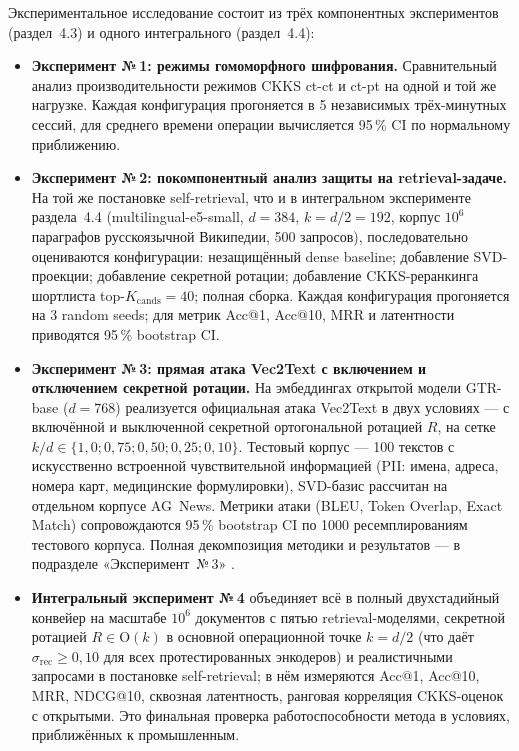 \documentclass[a4paper, 12pt, oneside, openany]{article}
\begin{document}
Экспериментальное исследование состоит из трёх компонентных экспериментов (раздел~4.3) и одного интегрального (раздел~4.4):
\begin{itemize}
	\item \textbf{Эксперимент №\,1: режимы гомоморфного шифрования.} Сравнительный анализ производительности режимов CKKS ct-ct и ct-pt на одной и той же нагрузке. Каждая конфигурация прогоняется в 5 независимых трёх-минутных сессий, для среднего времени операции вычисляется 95\,\% CI по нормальному приближению.
	\item \textbf{Эксперимент №\,2: покомпонентный анализ защиты на retrieval-задаче.} На той же постановке self-retrieval, что и в интегральном эксперименте раздела~4.4 (multilingual-e5-small, $d = 384$, $k = d/2 = 192$, корпус $10^6$ параграфов русскоязычной Википедии, 500 запросов), последовательно оцениваются конфигурации: незащищённый dense baseline; добавление SVD-проекции; добавление секретной ротации; добавление CKKS-реранкинга шортлиста top-$K_{\mathrm{cands}} = 40$; полная сборка. Каждая конфигурация прогоняется на 3 random seeds; для метрик Acc@1, Acc@10, MRR и латентности приводятся 95\,\% bootstrap CI.
	\item \textbf{Эксперимент №\,3: прямая атака Vec2Text с включением и отключением секретной ротации.} На эмбеддингах открытой модели GTR-base ($d = 768$) реализуется официальная атака Vec2Text \cite{ref5} в двух условиях --- с включённой и выключенной секретной ортогональной ротацией $R$, на сетке $k/d \in \{1{,}0; 0{,}75; 0{,}50; 0{,}25; 0{,}10\}$. Тестовый корпус --- 100 текстов с искусственно встроенной чувствительной информацией (PII: имена, адреса, номера карт, медицинские формулировки), SVD-базис рассчитан на отдельном корпусе AG~News. Метрики атаки (BLEU, Token Overlap, Exact Match) сопровождаются 95\,\% bootstrap CI по 1000 ресемплированиям тестового корпуса. Полная декомпозиция методики и результатов --- в подразделе «Эксперимент~№\,3» .


\item \textbf{Интегральный эксперимент №\,4} объединяет всё в полный двухстадийный конвейер на масштабе $10^{6}$ документов с пятью retrieval-моделями, секретной ротацией $R \in \mathrm{O}(k)$ в основной операционной точке $k = d/2$ (что даёт $\sigma_{\mathrm{rec}} \geq 0{,}10$ для всех протестированных энкодеров) и реалистичными запросами в постановке self-retrieval; в нём измеряются Acc@1, Acc@10, MRR, NDCG@10, сквозная латентность, ранговая корреляция CKKS-оценок с открытыми. Это финальная проверка работоспособности метода в условиях, приближённых к промышленным.

\end{itemize}
\end{document}
